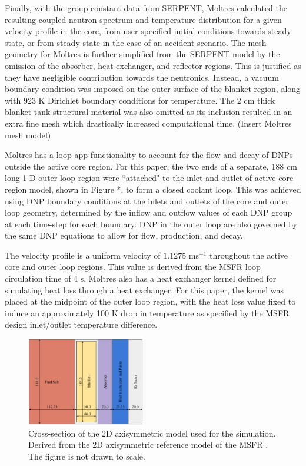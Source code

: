 \documentclass{anstrans}
\begin{document}
	Finally, with the group constant data from SERPENT, Moltres
	calculated the resulting coupled neutron spectrum and temperature
	distribution for a given velocity profile in the core, from user-specified
	initial conditions towards steady state, or from steady state in the case
	of an accident scenario. The mesh geometry for Moltres is
	further simplified from the SERPENT model by the omission of the absorber,
	heat exchanger, and reflector regions. This is justified as they have
	negligible contribution towards the neutronics. Instead, a vacuum
	boundary condition was imposed on the outer surface of the blanket region,
	along with 923 K Dirichlet boundary conditions for temperature.
	The 2 cm thick blanket tank structural material was also omitted as its
	inclusion resulted in an extra fine mesh which drastically
	increased computational time. (Insert Moltres mesh model)
	
	Moltres has a loop app functionality to account for the flow and decay of
	\glspl{DNP} outside the active core region. For this paper, the two ends of
	a separate, 188 cm long 1-D outer
	loop region were ``attached" to the inlet and outlet of active core region
	model, shown in Figure *, to form a closed coolant loop. This was achieved
	using \gls{DNP} boundary
	conditions at the inlets and outlets of the core and outer loop geometry,
	determined by the inflow and outflow values of each \gls{DNP} group at
	each time-step for each boundary.
	\gls{DNP} in the outer loop are also governed by the same \gls{DNP}
	equations to allow for flow, production, and decay.
	
	The velocity profile is a uniform velocity of $1.1275$ ms$^{-1}$ throughout
	the active core and outer loop regions. This value is derived from the
	\gls{MSFR} loop circulation time of 4 s. Moltres also has a heat exchanger
	kernel defined for simulating heat loss through
	a heat exchanger. For this paper, the kernel was placed at the midpoint of
	the outer loop region, with the heat loss value fixed to induce an
	approximately 100 K
	drop in temperature as specified by the \gls{MSFR} design inlet/outlet
	temperature difference.
	
	
\begin{figure}[t] 
	\centering
	\includegraphics[width=0.46\textwidth]{./figures/reference}
	\captionsetup{justification=centering}
	\caption{Cross-section of the 2D axisymmetric model used for the
	simulation. Derived from the 2D axisymmetric reference model of the MSFR
	\cite{pettersen_coupled_2016}. The figure is not drawn to scale.}
	\label{fig:reference}
\end{figure} 
\end{document}
